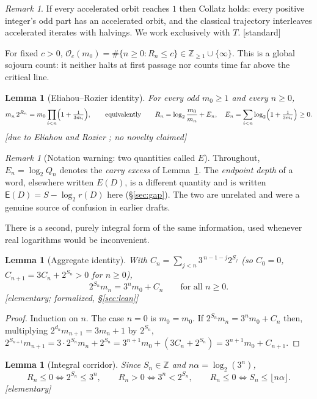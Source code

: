 \documentclass[11pt]{article}
\theoremstyle{plain}
\newtheorem{lemma}[theorem]{Lemma}
\theoremstyle{definition}
\theoremstyle{remark}
\newtheorem{remark}[theorem]{Remark}
\newcommand{\Occ}{\mathcal{O}}
\newcommand{\Edep}{\mathsf{E}}          %
\newcommand{\al}{\alpha}
\newcommand{\status}[1]{\textsf{\footnotesize[#1]}}
\begin{document}
\begin{remark}
If every accelerated orbit reaches $1$ then Collatz holds: every positive integer's odd part has an
accelerated orbit, and the classical trajectory interleaves accelerated iterates with halvings. We
work exclusively with $T$. \status{standard}
\end{remark}

For fixed $c>0$, $\Occ_c(m_0)=\#\{n\ge0:R_n\le c\}\in\mathbb{Z}_{\ge1}\cup\{\infty\}$. This is a
global sojourn count: it neither halts at first passage nor counts time far above the critical line.

\begin{lemma}[Eliahou--Rozier identity]\label{lem:ER}
For every odd $m_0\ge1$ and every $n\ge0$,
\[
m_n\,2^{R_n}=m_0\prod_{i<n}\Bigl(1+\tfrac{1}{3m_i}\Bigr),
\qquad\text{equivalently}\qquad
R_n=\log_2\frac{m_0}{m_n}+E_n,\quad
E_n=\sum_{i<n}\log_2\Bigl(1+\tfrac{1}{3m_i}\Bigr)\ge0 .
\]
\status{due to Eliahou \cite{Eliahou} and Rozier \cite{Rozier}; no novelty claimed}
\end{lemma}

\begin{remark}[Notation warning: two quantities called $E$]\label{rem:twoE}
Throughout, $E_n=\log_2 Q_n$ denotes the \emph{carry excess} of Lemma~\ref{lem:ER}. The
\emph{endpoint depth} of a word, elsewhere written $E(D)$, is a different quantity and is written
$\Edep(D)=S-\log_2 r(D)$ here (\S\ref{sec:gap}). The two are unrelated and were a genuine source of
confusion in earlier drafts.
\end{remark}

There is a second, purely integral form of the same information, used whenever real logarithms
would be inconvenient.

\begin{lemma}[Aggregate identity]\label{lem:aggregate}
With $C_n=\sum_{j<n}3^{\,n-1-j}2^{S_j}$ (so $C_0=0$, $C_{n+1}=3C_n+2^{S_n}>0$ for $n\ge0$),
\[
2^{S_n}m_n=3^n m_0+C_n \qquad\text{for all }n\ge0 .
\]
\status{elementary; formalized, \S\ref{sec:lean}}
\end{lemma}

\begin{proof}
Induction on $n$. The case $n=0$ is $m_0=m_0$. If $2^{S_n}m_n=3^nm_0+C_n$ then, multiplying
$2^{d_n}m_{n+1}=3m_n+1$ by $2^{S_n}$,
$2^{S_{n+1}}m_{n+1}=3\cdot 2^{S_n}m_n+2^{S_n}=3^{n+1}m_0+(3C_n+2^{S_n})=3^{n+1}m_0+C_{n+1}$.
\end{proof}

\begin{lemma}[Integral corridor]\label{lem:integral}
Since $S_n\in\mathbb{Z}$ and $n\al=\log_2(3^n)$,
\[
R_n\le 0\iff 2^{S_n}\le 3^n,\qquad R_n>0\iff 3^n<2^{S_n},\qquad R_n\le0\iff S_n\le\lfloor n\al\rfloor .
\]
\status{elementary}
\end{lemma}
\end{document}
